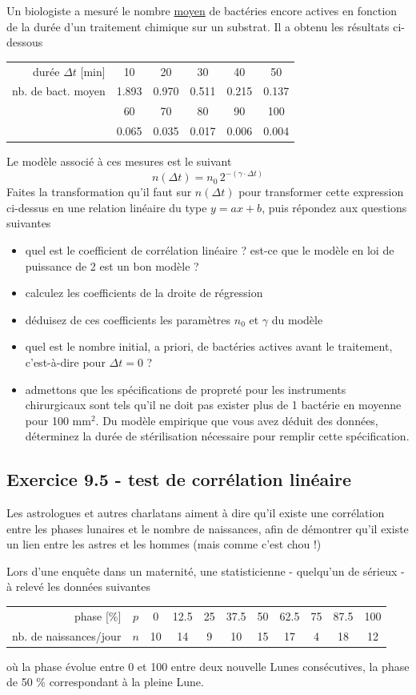 Un biologiste a mesuré le nombre \underline{moyen} de bactéries encore actives en fonction de la durée d'un traitement chimique sur un substrat. Il a obtenu les résultats ci-dessous
\begin{center}
\begin{tabular}{r|ccccc}
durée $\Delta t$ [min] & 10 & 20 & 30 & 40 & 50 \\
nb. de bact. moyen & 1.893 & 0.970 & 0.511 & 0.215 & 0.137 \\
 & 60 & 70 & 80 & 90 & 100\\
 & 0.065 & 0.035 & 0.017 & 0.006 & 0.004
\end{tabular}
\end{center}
Le modèle associé à ces mesures est le suivant
$$
n(\Delta t)=n_0\,2^{-(\gamma\cdot\Delta t)}
$$
Faites la transformation qu'il faut sur $n(\Delta t)$ pour transformer cette expression ci-dessus en une relation linéaire du type $y=ax+b$, puis répondez aux questions suivantes
\begin{itemize}
\item quel est le coefficient de corrélation linéaire ? est-ce que le modèle en loi de puissance de 2 est un bon modèle ?
\item calculez les coefficients de la droite de régression
\item déduisez de ces coefficients les paramètres $n_0$ et $\gamma$ du modèle
\item quel est le nombre initial, a priori, de bactéries actives avant le traitement, c'est-à-dire pour $\Delta t=0$ ?
\item admettons que les spécifications de propreté pour les instruments chirurgicaux sont tels qu'il ne doit pas exister plus de 1 bactérie en moyenne pour 100 mm$^2$. Du modèle empirique que vous avez déduit des données, déterminez la durée de stérilisation nécessaire pour remplir cette spécification.
\end{itemize}

\subsection*{Exercice 9.5 - test de corrélation linéaire}

Les astrologues et autres charlatans aiment à dire qu'il existe une corrélation entre les phases lunaires et le nombre de naissances, afin de démontrer qu'il existe un lien entre les astres et les hommes (mais comme c'est chou !)

Lors d'une enquête dans un maternité, une statisticienne - quelqu'un de sérieux - à relevé les données suivantes
\begin{center}
\begin{tabular}{r|c|ccccccccc}
phase [\%] & $p$ & 0 & 12.5 & 25 & 37.5 & 50 & 62.5 & 75 & 87.5 & 100\\
nb. de naissances/jour & $n$ & 10 & 14 & 9 & 10 & 15 & 17 & 4 & 18 & 12
\end{tabular}
\end{center}
où la phase évolue entre 0 et 100 entre deux nouvelle Lunes consécutives, la phase de 50 \% correspondant à la pleine Lune.

